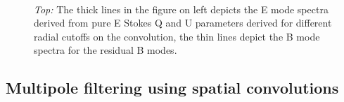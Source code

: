 %
\begin{figure}[!t] 
\centering
{}
\\[-5ex]
\caption{\textit{Top:} The thick lines in the figure on left depicts the E mode spectra derived from pure E Stokes Q and U parameters derived for different radial cutoffs on the convolution, the thin lines depict the B mode spectra for the residual B modes.}
\label{fig:equ-bqu-spectra_rad_cutoff}
\end{figure}
%
\subsection{Multipole filtering using spatial convolutions}
